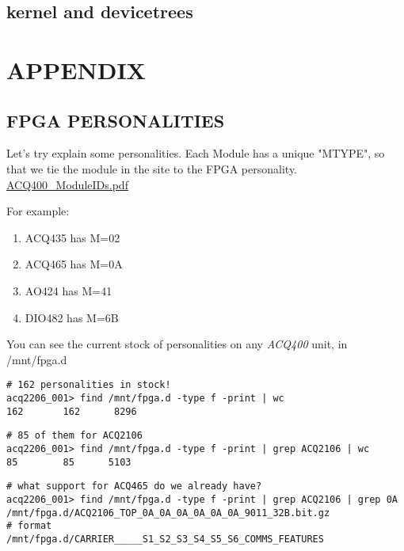 \documentclass[]{article}
\newcommand{\glossy}[1]{{\color{blue}\itshape #1}}
\begin{document}
\subsection{kernel and devicetrees}

\pagebreak

\section{APPENDIX}
	
	
\subsection{FPGA PERSONALITIES}\label{sec:fpga-personalities}

Let's try explain some personalities. Each Module has a unique "MTYPE", so that we tie the module in the site to the FPGA personality. 
\href{https://www.d-tacq.com/resources/Products_ACQ400_ModuleIDs.pdf}{ACQ400_ModuleIDs.pdf}

For example:
\begin{enumerate}
	\item ACQ435 has M=02
	\item ACQ465 has M=0A
	\item AO424  has M=41
	\item DIO482 has M=6B
\end{enumerate}

You can see the current stock of personalities on any \glossy{ACQ400} unit, in /mnt/fpga.d

\begin{lstlisting}[style=bashstyle,frame=single]
# 162 personalities in stock!
acq2206_001> find /mnt/fpga.d -type f -print | wc
162       162      8296
\end{lstlisting}

\begin{lstlisting}[style=bashstyle,frame=single]
# 85 of them for ACQ2106
acq2206_001> find /mnt/fpga.d -type f -print | grep ACQ2106 | wc
85        85      5103
\end{lstlisting}

\begin{lstlisting}[style=bashstyle,frame=single]
# what support for ACQ465 do we already have?
acq2206_001> find /mnt/fpga.d -type f -print | grep ACQ2106 | grep 0A
/mnt/fpga.d/ACQ2106_TOP_0A_0A_0A_0A_0A_0A_9011_32B.bit.gz
# format
/mnt/fpga.d/CARRIER_____S1_S2_S3_S4_S5_S6_COMMS_FEATURES
\end{lstlisting}
\end{document}
